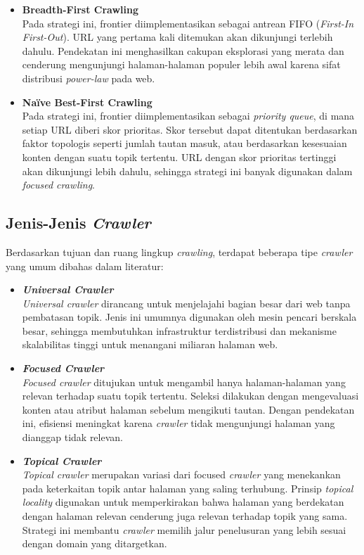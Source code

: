 \begin{itemize}
  \item \textbf{Breadth-First Crawling} \\
  Pada strategi ini, frontier diimplementasikan sebagai antrean FIFO (\textit{First-In First-Out}). URL yang pertama kali ditemukan akan dikunjungi terlebih dahulu. Pendekatan ini menghasilkan cakupan eksplorasi yang merata dan cenderung mengunjungi halaman-halaman populer lebih awal karena sifat distribusi \textit{power-law} pada web.

  \item \textbf{Na\"{i}ve Best-First Crawling} \\
  Pada strategi ini, frontier diimplementasikan sebagai \textit{priority queue}, di mana setiap URL diberi skor prioritas. Skor tersebut dapat ditentukan berdasarkan faktor topologis seperti jumlah tautan masuk, atau berdasarkan kesesuaian konten dengan suatu topik tertentu. URL dengan skor prioritas tertinggi akan dikunjungi lebih dahulu, sehingga strategi ini banyak digunakan dalam \textit{focused crawling}.
\end{itemize}


\subsection{Jenis-Jenis \textit{Crawler}}
\label{subsec:0204-jenis-crawler}

Berdasarkan tujuan dan ruang lingkup \textit{crawling}, terdapat beberapa tipe \textit{crawler} yang umum dibahas dalam literatur:

\begin{itemize}
  \item \textbf{\textit{Universal Crawler}} \\
  \textit{Universal crawler} dirancang untuk menjelajahi bagian besar dari web tanpa pembatasan topik. Jenis ini umumnya digunakan oleh mesin pencari berskala besar, sehingga membutuhkan infrastruktur terdistribusi dan mekanisme skalabilitas tinggi untuk menangani miliaran halaman web.  

  \item \textbf{\textit{Focused Crawler}} \\
  \textit{Focused crawler} ditujukan untuk mengambil hanya halaman-halaman yang relevan terhadap suatu topik tertentu. Seleksi dilakukan dengan mengevaluasi konten atau atribut halaman sebelum mengikuti tautan. Dengan pendekatan ini, efisiensi meningkat karena \textit{crawler} tidak mengunjungi halaman yang dianggap tidak relevan.  

  \item \textbf{\textit{Topical Crawler}} \\
  \textit{Topical crawler} merupakan variasi dari focused \textit{crawler} yang menekankan pada keterkaitan topik antar halaman yang saling terhubung. Prinsip \textit{topical locality} digunakan untuk memperkirakan bahwa halaman yang berdekatan dengan halaman relevan cenderung juga relevan terhadap topik yang sama. Strategi ini membantu \textit{crawler} memilih jalur penelusuran yang lebih sesuai dengan domain yang ditargetkan.  
\end{itemize}

